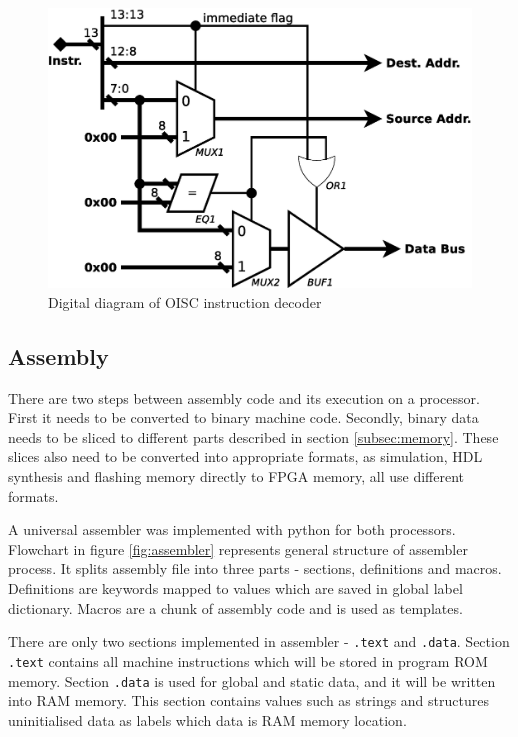 \begin{figure}
	\centering
	\includegraphics[scale=0.4]{../resources/oisc_decoder.eps}
	\caption{Digital diagram of OISC instruction decoder}
	\label{fig:oisc_decoder}
\end{figure}

\subsection{Assembly}\label{subsec:assembly}

There are two steps between assembly code and its execution on a processor. First it needs to be converted to binary machine code. Secondly, binary data needs to be sliced to different parts described in section \ref{subsec:memory}. These slices also need to be converted into appropriate formats, as simulation, HDL synthesis and flashing memory directly to FPGA memory, all use different formats.


A universal assembler was implemented with python for both processors. Flowchart in figure \ref{fig:assembler} represents general structure of assembler process. It splits assembly file into three parts - sections, definitions and macros. Definitions are keywords mapped to values which are saved in global label dictionary. Macros are a chunk of assembly code and is used as templates. 

There are only two sections implemented in assembler - \texttt{.text} and \texttt{.data}. Section \texttt{.text} contains all machine instructions which will be stored in program ROM memory. Section \texttt{.data} is used for global and static data, and it will be written into RAM memory. This section contains values such as strings and structures uninitialised data as labels which data is RAM memory location. 

